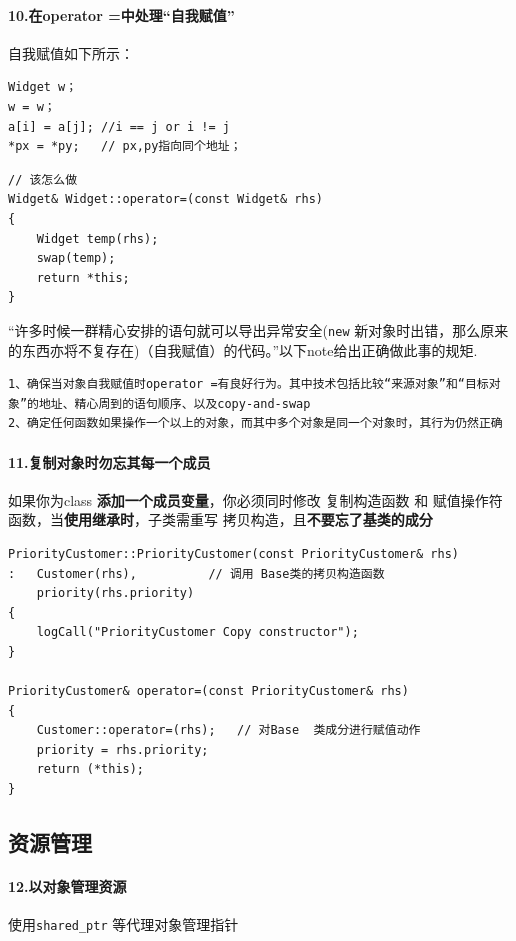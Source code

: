 \documentclass[UTF8,a4paper,12pt]{ctexbook}
\begin{document}
		\paragraph{10.在operator =中处理“自我赋值”}
			自我赋值如下所示：
		\begin{lstlisting}
Widget w；
w = w；
a[i] = a[j]; //i == j or i != j
*px = *py;	 // px,py指向同个地址；
		\end{lstlisting}
		
		\begin{lstlisting}
// 该怎么做
Widget& Widget::operator=(const Widget& rhs)
{ 
	Widget temp(rhs);
	swap(temp);
	return *this;
} 
		\end{lstlisting}
		
		“许多时候一群精心安排的语句就可以导出异常安全(\verb|new| 新对象时出错，那么原来的东西亦将不复存在)（自我赋值）的代码。”以下note给出正确做此事的规矩.
		\begin{lstlisting}[frame = lbrT]
1、确保当对象自我赋值时operator =有良好行为。其中技术包括比较“来源对象”和“目标对象”的地址、精心周到的语句顺序、以及copy-and-swap
2、确定任何函数如果操作一个以上的对象，而其中多个对象是同一个对象时，其行为仍然正确
		\end{lstlisting}	
				
		\paragraph{11.复制对象时勿忘其每一个成员} 如果你为class \textbf{添加一个成员变量}，你必须同时修改 复制构造函数 和 赋值操作符函数，当\textbf{使用继承时}，子类需重写 拷贝构造，且\textbf{不要忘了基类的成分}
		
			\begin{lstlisting}
PriorityCustomer::PriorityCustomer(const PriorityCustomer& rhs)
: 	Customer(rhs), 			// 调用 Base类的拷贝构造函数
	priority(rhs.priority)
{
	logCall("PriorityCustomer Copy constructor");
}

PriorityCustomer& operator=(const PriorityCustomer& rhs)
{
	Customer::operator=(rhs);  	// 对Base  类成分进行赋值动作
	priority = rhs.priority;
	return (*this);
}
			\end{lstlisting}
		

	\subsection{资源管理}
		\paragraph{12.以对象管理资源} 使用\verb|shared_ptr| 等代理对象管理指针
\end{document}
